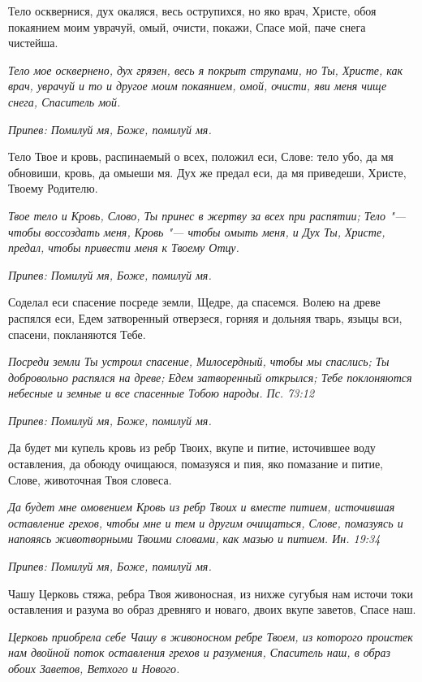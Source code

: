 Тело осквернися, дух окаляся, весь острупихся, но яко врач, Христе, обоя покаянием моим уврачуй, омый, очисти, покажи, Спасе мой, паче снега чистейша.


\itshape Тело мое осквернено, дух грязен, весь я покрыт струпами, но Ты, Христе, как врач, уврачуй и то и другое моим покаянием, омой, очисти, яви меня чище снега, Спаситель мой.\normalfont{}


\itshape Припев:\normalfont{} Помилуй мя, Боже, помилуй мя.


Тело Твое и кровь, распинаемый о всех, положил еси, Слове: тело убо, да мя обновиши, кровь, да омыеши мя. Дух же предал еси, да мя приведеши, Христе, Твоему Родителю.


\itshape Твое тело и Кровь, Слово, Ты принес в жертву за всех при распятии; Тело "--- чтобы воссоздать меня, Кровь "--- чтобы омыть меня, и Дух Ты, Христе, предал, чтобы привести меня к Твоему Отцу.\normalfont{}


\itshape Припев:\normalfont{} Помилуй мя, Боже, помилуй мя.


Соделал еси спасение посреде земли, Щедре, да спасемся. Волею на древе распялся еси, Едем затворенный отверзеся, горняя и дольняя тварь, языцы вси, спасени, покланяются Тебе.


\itshape Посреди земли Ты устроил спасение, Милосердный, чтобы мы спаслись; Ты добровольно распялся на древе; Едем затворенный открылся; Тебе поклоняются небесные и земные и все спасенные Тобою народы. Пс. 73:12\normalfont{}


\itshape Припев:\normalfont{} Помилуй мя, Боже, помилуй мя.


Да будет ми купель кровь из ребр Твоих, вкупе и питие, источившее воду оставления, да обоюду очищаюся, помазуяся и пия, яко помазание и питие, Слове, животочная Твоя словеса.


\itshape Да будет мне омовением Кровь из ребр Твоих и вместе питием, источившая оставление грехов, чтобы мне и тем и другим очищаться, Слове, помазуясь и напояясь животворными Твоими словами, как мазью и питием. Ин. 19:34\normalfont{}


\itshape Припев:\normalfont{} Помилуй мя, Боже, помилуй мя.


Чашу Церковь стяжа, ребра Твоя живоносная, из нихже сугубыя нам источи токи оставления и разума во образ древняго и новаго, двоих вкупе заветов, Спасе наш.


\itshape Церковь приобрела себе Чашу в живоносном ребре Твоем, из которого проистек нам двойной поток оставления грехов и разумения, Спаситель наш, в образ обоих Заветов, Ветхого и Нового.\normalfont{}


